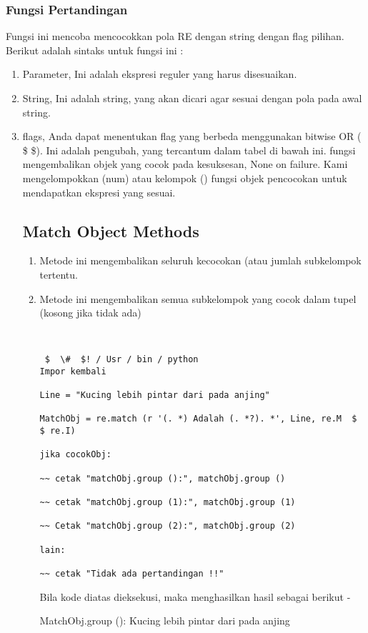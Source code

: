 \subsubsection {Fungsi Pertandingan}
Fungsi ini mencoba mencocokkan pola RE dengan string dengan flag pilihan.
Berikut adalah sintaks untuk fungsi ini :
\begin {enumerate}
\item Parameter, Ini adalah ekspresi reguler yang harus disesuaikan.
\item String, Ini adalah string, yang akan dicari agar sesuai dengan pola pada awal string.
\item flags, Anda dapat menentukan flag yang berbeda menggunakan bitwise OR ( \$ \$). Ini adalah pengubah, yang tercantum dalam tabel di bawah ini. fungsi mengembalikan objek yang cocok pada kesuksesan, None on failure. Kami mengelompokkan (num) atau kelompok () fungsi objek pencocokan untuk mendapatkan ekspresi yang sesuai.

\subsection {Match Object Methods}
\begin {enumerate}
\item Metode ini mengembalikan seluruh kecocokan (atau jumlah subkelompok tertentu.
\item Metode ini mengembalikan semua subkelompok yang cocok dalam tupel (kosong jika tidak ada)

\begin{verbatim}


 $  \#  $! / Usr / bin / python
Impor kembali

Line = "Kucing lebih pintar dari pada anjing"

MatchObj = re.match (r '(. *) Adalah (. *?). *', Line, re.M  $    $ re.I)

jika cocokObj:

~~ cetak "matchObj.group ():", matchObj.group ()

~~ cetak "matchObj.group (1):", matchObj.group (1)

~~ Cetak "matchObj.group (2):", matchObj.group (2)

lain:

~~ cetak "Tidak ada pertandingan !!"
\end{verbatim}

Bila kode diatas dieksekusi, maka menghasilkan hasil sebagai berikut -

MatchObj.group (): Kucing lebih pintar dari pada anjing


\end{enumerate}
\end{enumerate}
